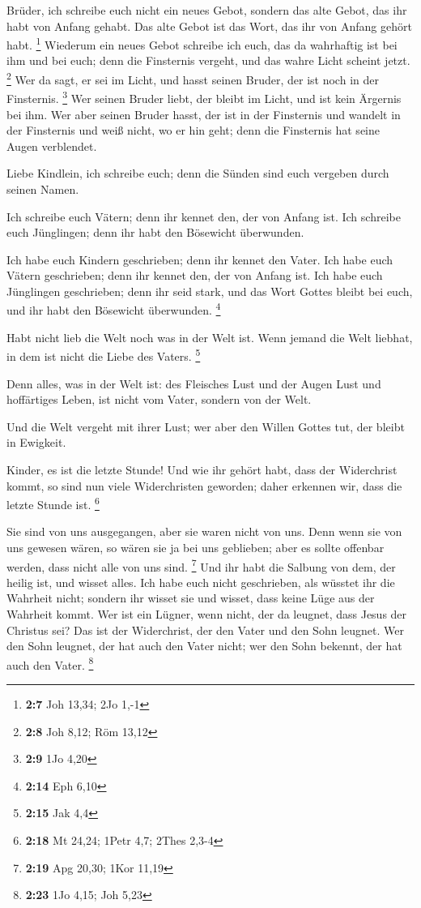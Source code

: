  Brüder, ich schreibe euch nicht ein neues Gebot, sondern
das alte Gebot, das ihr habt von Anfang gehabt. Das alte Gebot ist das
Wort, das ihr von Anfang gehört habt. \footnote{\textbf{2:7} Joh 13,34;
  2Jo 1,-1}  Wiederum ein neues Gebot schreibe ich euch,
das da wahrhaftig ist bei ihm und bei euch; denn die Finsternis vergeht,
und das wahre Licht scheint jetzt. \footnote{\textbf{2:8} Joh 8,12; Röm
  13,12}  Wer da sagt, er sei im Licht, und hasst seinen
Bruder, der ist noch in der Finsternis. \footnote{\textbf{2:9} 1Jo 4,20}
 Wer seinen Bruder liebt, der bleibt im Licht, und ist
kein Ärgernis bei ihm.  Wer aber seinen Bruder hasst, der
ist in der Finsternis und wandelt in der Finsternis und weiß nicht, wo
er hin geht; denn die Finsternis hat seine Augen verblendet.

 Liebe Kindlein, ich schreibe euch; denn die Sünden sind
euch vergeben durch seinen Namen.

 Ich schreibe euch Vätern; denn ihr kennet den, der von
Anfang ist. Ich schreibe euch Jünglingen; denn ihr habt den Bösewicht
überwunden.

 Ich habe euch Kindern geschrieben; denn ihr kennet den
Vater. Ich habe euch Vätern geschrieben; denn ihr kennet den, der von
Anfang ist. Ich habe euch Jünglingen geschrieben; denn ihr seid stark,
und das Wort Gottes bleibt bei euch, und ihr habt den Bösewicht
überwunden. \footnote{\textbf{2:14} Eph 6,10}

 Habt nicht lieb die Welt noch was in der Welt ist. Wenn
jemand die Welt liebhat, in dem ist nicht die Liebe des Vaters.
\footnote{\textbf{2:15} Jak 4,4}

 Denn alles, was in der Welt ist: des Fleisches Lust und
der Augen Lust und hoffärtiges Leben, ist nicht vom Vater, sondern von
der Welt.

 Und die Welt vergeht mit ihrer Lust; wer aber den Willen
Gottes tut, der bleibt in Ewigkeit.

 Kinder, es ist die letzte Stunde! Und wie ihr gehört
habt, dass der Widerchrist kommt, so sind nun viele Widerchristen
geworden; daher erkennen wir, dass die letzte Stunde ist. \footnote{\textbf{2:18}
  Mt 24,24; 1Petr 4,7; 2Thes 2,3-4}

 Sie sind von uns ausgegangen, aber sie waren nicht von
uns. Denn wenn sie von uns gewesen wären, so wären sie ja bei uns
geblieben; aber es sollte offenbar werden, dass nicht alle von uns sind.
\footnote{\textbf{2:19} Apg 20,30; 1Kor 11,19}  Und ihr
habt die Salbung von dem, der heilig ist, und wisset alles.
 Ich habe euch nicht geschrieben, als wüsstet ihr die
Wahrheit nicht; sondern ihr wisset sie und wisset, dass keine Lüge aus
der Wahrheit kommt.  Wer ist ein Lügner, wenn nicht, der
da leugnet, dass Jesus der Christus sei? Das ist der Widerchrist, der
den Vater und den Sohn leugnet.  Wer den Sohn leugnet,
der hat auch den Vater nicht; wer den Sohn bekennt, der hat auch den
Vater. \footnote{\textbf{2:23} 1Jo 4,15; Joh 5,23}

